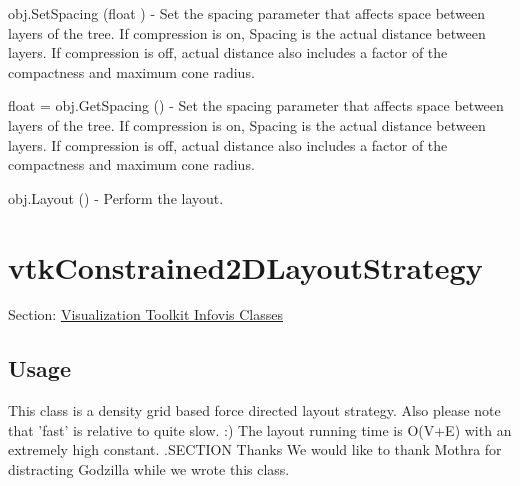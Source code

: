 \begin{DoxyItemize}
\item {\ttfamily obj.\-Set\-Spacing (float )} -\/ Set the spacing parameter that affects space between layers of the tree. If compression is on, Spacing is the actual distance between layers. If compression is off, actual distance also includes a factor of the compactness and maximum cone radius.  
\item {\ttfamily float = obj.\-Get\-Spacing ()} -\/ Set the spacing parameter that affects space between layers of the tree. If compression is on, Spacing is the actual distance between layers. If compression is off, actual distance also includes a factor of the compactness and maximum cone radius.  
\item {\ttfamily obj.\-Layout ()} -\/ Perform the layout.  
\end{DoxyItemize}\hypertarget{vtkinfovis_vtkconstrained2dlayoutstrategy}{}\section{vtk\-Constrained2\-D\-Layout\-Strategy}\label{vtkinfovis_vtkconstrained2dlayoutstrategy}
Section\-: \hyperlink{sec_vtkinfovis}{Visualization Toolkit Infovis Classes} \hypertarget{vtkwidgets_vtkxyplotwidget_Usage}{}\subsection{Usage}\label{vtkwidgets_vtkxyplotwidget_Usage}
This class is a density grid based force directed layout strategy. Also please note that 'fast' is relative to quite slow. \-:) The layout running time is O(V+\-E) with an extremely high constant. .S\-E\-C\-T\-I\-O\-N Thanks We would like to thank Mothra for distracting Godzilla while we wrote this class.

